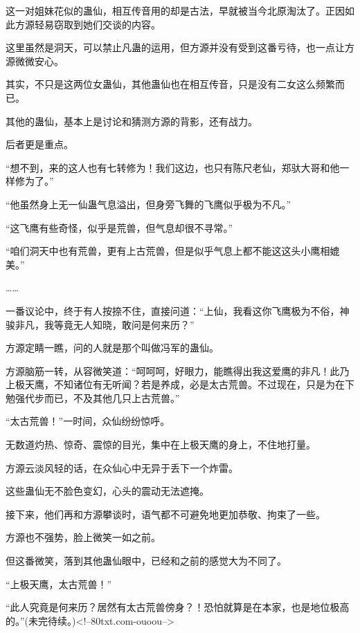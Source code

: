 \begin{this_body}
这一对姐妹花似的蛊仙，相互传音用的却是古法，早就被当今北原淘汰了。正因如此方源轻易窃取到她们交谈的内容。

这里虽然是洞天，可以禁止凡蛊的运用，但方源并没有受到这番亏待，也一点让方源微微安心。

其实，不只是这两位女蛊仙，其他蛊仙也在相互传音，只是没有二女这么频繁而已。

其他的蛊仙，基本上是讨论和猜测方源的背影，还有战力。

后者更是重点。

“想不到，来的这人也有七转修为！我们这边，也只有陈尺老仙，郑驮大哥和他一样修为了。”

“他虽然身上无一仙蛊气息溢出，但身旁飞舞的飞鹰似乎极为不凡。”

“这飞鹰有些奇怪，似乎是荒兽，但气息却很不寻常。”

“咱们洞天中也有荒兽，更有上古荒兽，但是似乎气息上都不能这这头小鹰相媲美。”

……

一番议论中，终于有人按捺不住，直接问道：“上仙，我看这你飞鹰极为不俗，神骏非凡，我等竟无人知晓，敢问是何来历？”

方源定睛一瞧，问的人就是那个叫做冯军的蛊仙。

方源脑筋一转，从容微笑道：“呵呵呵，好眼力，能瞧得出我这爱鹰的非凡！此乃上极天鹰，不知诸位有无听闻？若是养成，必是太古荒兽。不过现在，只是为在下勉强代步而已，不及其他几只上古荒兽。”

“太古荒兽！”一时间，众仙纷纷惊呼。

无数道灼热、惊奇、震惊的目光，集中在上极天鹰的身上，不住地打量。

方源云淡风轻的话，在众仙心中无异于丢下一个炸雷。

这些蛊仙无不脸色变幻，心头的震动无法遮掩。

接下来，他们再和方源攀谈时，语气都不可避免地更加恭敬、拘束了一些。

方源也不强势，脸上微笑一如之前。

但这番微笑，落到其他蛊仙眼中，已经和之前的感觉大为不同了。

“上极天鹰，太古荒兽！”

“此人究竟是何来历？居然有太古荒兽傍身？！恐怕就算是在本家，也是地位极高的。”(未完待续。)<!--80txt.com-ouoou-->

\end{this_body}

